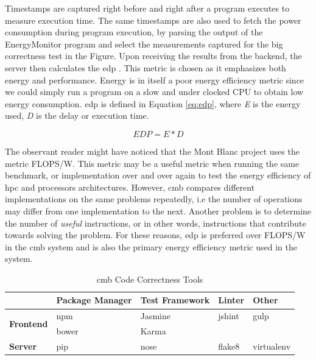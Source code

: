 Timestamps are captured right before and right after a program executes to measure execution time. The same timestamps are also used to fetch the power consumption during program execution, by parsing the output of the EnergyMonitor program and select the measurements captured for the big correctness test in the Figure. Upon receiving the results from the backend, the server then calculates the \gls{edp} \cite{a:edp}. This metric is chosen as it emphasizes both energy and performance. Energy is in itself a poor energy efficiency metric since we could simply run a program on a slow and under clocked CPU to obtain low energy consumption. \gls{edp} is defined in Equation \ref{eq:edp}, where \textit{E} is the energy used, \textit{D} is the delay or execution time.

\begin{equation}
  \label{eq:edp}
  EDP = E * D
\end{equation}

The observant reader might have noticed that the Mont Blanc project uses the metric FLOPS/W. This metric may be a useful metric when running the same benchmark, or implementation over and over again to test the energy efficiency of \gls{hpc} and processors architectures. However, \gls{cmb} compares different implementations on the same problems repeatedly, i.e the number of operations may differ from one implementation to the next. Another problem is to determine the number of \textit{useful} instructions, or in other words, instructions that contribute towards solving the problem. For these reasons, \gls{edp} is preferred over FLOPS/W in the \gls{cmb} system and is also the primary energy efficiency metric used in the system.

\begin{table}[b!]
  \centering
  \begin{tabular}{ l|p{2.1cm}|p{2.2cm}|l|l }
    & \textbf{Package Manager} & \raggedright\textbf{Test Framework} & \textbf{Linter} & \textbf{Other} \\ \hline
  \multirow{2}{*}{\textbf{Frontend}} & npm \cite{NPM} & Jasmine \cite{JASMINE} & jshint \cite{JSHINT} & gulp \cite{GULP} \\
                                     & bower \cite{BOWER} & Karma \cite{KARMA} &  &  \\ \hline
  \multirow{1}{*}{\textbf{Server}} & pip \cite{PIP} & nose \cite{NOSE} & flake8 \cite{FLAKE8} & virtualenv \cite{VIRTUALENV}\\
  \end{tabular}
  \caption{\gls{cmb} Code Correctness Tools}
  \label{tab:cct}
\end{table}


